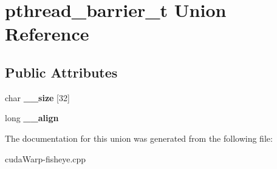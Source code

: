 \hypertarget{unionpthread__barrier__t}{}\section{pthread\+\_\+barrier\+\_\+t Union Reference}
\label{unionpthread__barrier__t}
\subsection*{Public Attributes}
\begin{DoxyCompactItemize}
\item 
char {\bfseries \+\_\+\+\_\+size} \mbox{[}32\mbox{]}\hypertarget{unionpthread__barrier__t_a509c1b161858978905c033fb34d2b810}{}\label{unionpthread__barrier__t_a509c1b161858978905c033fb34d2b810}

\item 
long {\bfseries \+\_\+\+\_\+align}\hypertarget{unionpthread__barrier__t_aecbc0e89d21965591dab07485b0d0f55}{}\label{unionpthread__barrier__t_aecbc0e89d21965591dab07485b0d0f55}

\end{DoxyCompactItemize}


The documentation for this union was generated from the following file\+:\begin{DoxyCompactItemize}
\item 
cuda\+Warp-\/fisheye.\+cpp\end{DoxyCompactItemize}
